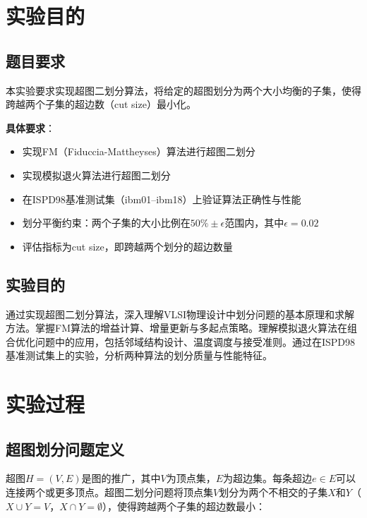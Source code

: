 \documentclass{SYSUReport}
\date{2026年5月17日}
\begin{document}
\cover
\thispagestyle{empty}
\clearpage

\setcounter{page}{1}
\tableofcontents
\clearpage

\setcounter{page}{1}

\section{实验目的}
\subsection{题目要求}
本实验要求实现超图二划分算法，将给定的超图划分为两个大小均衡的子集，使得跨越两个子集的超边数（cut size）最小化。

\textbf{具体要求}：
\begin{itemize}
\item 实现FM（Fiduccia-Mattheyses）算法进行超图二划分
\item 实现模拟退火算法进行超图二划分
\item 在ISPD98基准测试集（ibm01--ibm18）上验证算法正确性与性能
\item 划分平衡约束：两个子集的大小比例在$50\% \pm \epsilon$范围内，其中$\epsilon = 0.02$
\item 评估指标为cut size，即跨越两个划分的超边数量
\end{itemize}

\subsection{实验目的}
通过实现超图二划分算法，深入理解VLSI物理设计中划分问题的基本原理和求解方法。掌握FM算法的增益计算、增量更新与多起点策略。理解模拟退火算法在组合优化问题中的应用，包括邻域结构设计、温度调度与接受准则。通过在ISPD98基准测试集上的实验，分析两种算法的划分质量与性能特征。

\section{实验过程}

\subsection{超图划分问题定义}
超图$H = (V, E)$是图的推广，其中$V$为顶点集，$E$为超边集。每条超边$e \in E$可以连接两个或更多顶点。超图二划分问题将顶点集$V$划分为两个不相交的子集$X$和$Y$（$X \cup Y = V$，$X \cap Y = \emptyset$），使得跨越两个子集的超边数最小：
\end{document}
